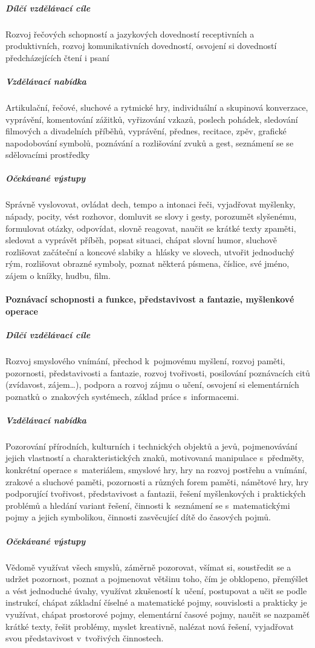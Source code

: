 					\subparagraph{Dílčí vzdělávací cíle}
						Rozvoj řečových schopností a jazykových dovedností receptivních a produktivních, rozvoj komunikativních dovedností, osvojení si dovedností předcházejících čtení i psaní
					\subparagraph{Vzdělávací nabídka}
						Artikulační, řečové, sluchové a rytmické hry, individuální a skupinová konverzace, vyprávění, komentování zážitků, vyřizování vzkazů, poslech pohádek, sledování filmových a divadelních příběhů, vyprávění, přednes, recitace, zpěv, grafické napodobování symbolů, poznávání a rozlišování zvuků a gest, seznámení se se sdělovacími prostředky
					\subparagraph{Očekávané výstupy}
						Správně vyslovovat, ovládat dech, tempo a intonaci řeči, vyjadřovat myšlenky, nápady, pocity, vést rozhovor, domluvit se slovy i gesty, porozumět slyšenému, formulovat otázky, odpovídat, slovně reagovat, naučit se krátké texty zpaměti, sledovat a vyprávět příběh, popsat situaci, chápat slovní humor, sluchově rozlišovat začáteční a koncové slabiky a hlásky ve slovech, utvořit jednoduchý rým, rozlišovat obrazné symboly, poznat některá písmena, číslice, své jméno, zájem o knížky, hudbu, film.

				\paragraph{Poznávací schopnosti a funkce, představivost a fantazie, myšlenkové operace}

					\subparagraph{Dílčí vzdělávací cíle}
						Rozvoj smyslového vnímání, přechod k pojmovému myšlení, rozvoj paměti, pozornosti, představivosti a fantazie, rozvoj tvořivosti, posilování poznávacích citů (zvídavost, zájem…), podpora a rozvoj zájmu o učení, osvojení si elementárních poznatků o znakových systémech, základ práce s informacemi.
					\subparagraph{Vzdělávací nabídka}
						Pozorování přírodních, kulturních i technických objektů a jevů, pojmenovávání jejich vlastností a charakteristických znaků, motivovaná manipulace s předměty, konkrétní operace s materiálem, smyslové hry, hry na rozvoj postřehu a vnímání, zrakové a sluchové paměti, pozornosti a různých forem paměti, námětové hry, hry podporující tvořivost, představivost a fantazii, řešení myšlenkových i praktických problémů a hledání variant řešení, činnosti k seznámení se s matematickými pojmy a jejich symbolikou, činnosti zasvěcující dítě do časových pojmů.
					\subparagraph{Očekávané výstupy}
						Vědomě využívat všech smyslů, záměrně pozorovat, všímat si, soustředit se a udržet pozornost, poznat a pojmenovat většinu toho, čím je obklopeno, přemýšlet a vést jednoduché úvahy, využívat zkušeností k učení, postupovat a učit se podle instrukcí, chápat základní číselné a matematické pojmy, souvislosti a prakticky je využívat, chápat prostorové pojmy, elementární časové pojmy, naučit se nazpaměť krátké texty, řešit problémy, myslet kreativně, nalézat nová řešení, vyjadřovat svou představivost v tvořivých činnostech.

